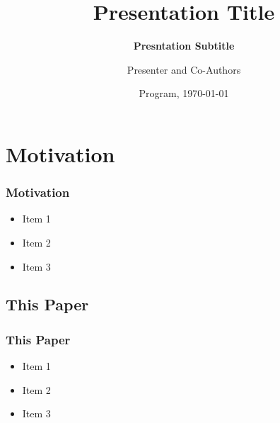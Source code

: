 \documentclass[11pt]{beamer}
\begin{document}
	
	
	\title[Presentation Title]{\bfseries Presentation Title}
	\subtitle{\bfseries Presntation Subtitle}
	\author[Full Name]{Presenter and Co-Authors}
	
	
	\date[\today]{Program, \today}
	
	\begin{frame}[plain]
		\maketitle
		
	\end{frame}

\section{Motivation}
	\begin{frame}
		\frametitle{\textbf{Motivation}}
		
		\begin{itemize}
			\item Item 1
			\item Item 2
			\item Item 3
		\end{itemize}
	\end{frame}
	
	\begin{frame}
		\section{This Paper}
		\frametitle{\textbf{This Paper}}
		
		\begin{itemize}
			\item Item 1
			\item Item 2
			\item Item 3
		\end{itemize}
	\end{frame}
\end{document}
